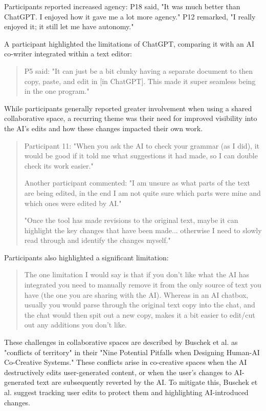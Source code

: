 Participants reported increased agency: P18 said, "It was much better than ChatGPT. I enjoyed how it gave me a lot more agency." P12 remarked, "I really enjoyed it; it still let me have autonomy."

A participant highlighted the limitations of ChatGPT, comparing it with an AI co-writer integrated within a text editor:

\begin{quote}
P5 said: "It can just be a bit clunky having a separate document to then copy, paste, and edit in [in ChatGPT]. This made it super seamless being in the one program."
\end{quote}

While participants generally reported greater involvement when using a shared collaborative space, a recurring theme was their need for improved visibility into the AI's edits and how these changes impacted their own work.

\begin{quote}
Participant 11: "When you ask the AI to check your grammar (as I did), it would be good if it told me what suggestions it had made, so I can double check its work easier."

Another participant commented: "I am unsure as what parts of the text are being edited, in the end I am not quite sure which parts were mine and which ones were edited by AI."

"Once the tool has made revisions to the original text, maybe it can highlight the key changes that have been made... otherwise I need to slowly read through and identify the changes myself."
\end{quote}
Participants also highlighted a significant limitation:
\begin{quote}
The one limitation I would say is that if you don't like what the AI has integrated you need to manually remove it from the only source of text you have (the one you are sharing with the AI). Whereas in an AI chatbox, usually you would parse through the original text copy into the chat, and the chat would then spit out a new copy, makes it a bit easier to edit/cut out any additions you don't like.
\end{quote}

These challenges in collaborative spaces are described by Buschek et al. \cite{Buschek2021-ks} as "conflicts of territory" in their "Nine Potential Pitfalls when Designing Human-AI Co-Creative Systems." These conflicts arise in co-creative spaces when the AI destructively edits user-generated content, or when the user's changes to AI-generated text are subsequently reverted by the AI. To mitigate this, Buschek et al. suggest tracking user edits to protect them and highlighting AI-introduced changes.

